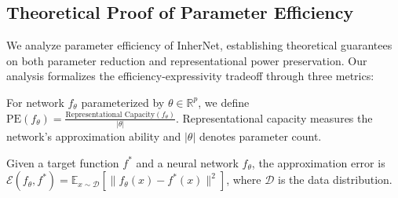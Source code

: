 \documentclass{article} %
\begin{document}



\subsection{Theoretical Proof of Parameter Efficiency}
\label{sec:parameter}

We analyze parameter efficiency of InherNet, establishing theoretical guarantees on both parameter reduction and representational power preservation. Our analysis formalizes the efficiency-expressivity tradeoff through three metrics:

\begin{definition}\label{def:pe_}
For network $f_\theta$ parameterized by $\theta \in \mathbb{R}^p$, we define $\text{PE}(f_\theta) = \frac{\text{Representational Capacity}(f_\theta)}{|\theta|}$. Representational capacity measures the network's approximation ability and $|\theta|$ denotes parameter count.
\end{definition}

\begin{definition}\label{def:approx-error_}
Given a target function $f^*$ and a neural network $f_\theta$, the approximation error is 
$\mathcal{E}(f_\theta, f^*) = \mathbb{E}_{x \sim \mathcal{D}}[\|f_\theta(x) - f^*(x)\|^2]$,
where $\mathcal{D}$ is the data distribution.
\end{definition}
\end{document}
